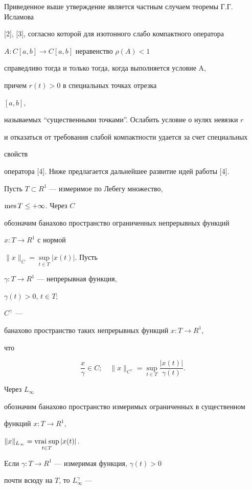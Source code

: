 Приведенное выше утверждение является частным случаем теоремы Г.Г.\,Исламова


[2], [3], согласно которой для изотонного слабо компактного оператора


$A:C[a,b]\to C[a,b]$ неравенство $\rho(A)<1$


справедливо тогда и только тогда, когда выполняется условие A,


причем $r(t) >0$ в специальных точках отрезка


$[a,b],$


называемых ``существенными точками''. Ослабить условие о нулях невязки $r$


и отказаться от требования слабой компактности удается за счет специальных


свойств


оператора [4]. Ниже предлагается дальнейшее развитие идей работы [4].





Пусть $T\subset R^1$ --- измеримое по Лебегу множество,


$\operatorname{mes} T\leq + \infty$. Через $C$


обозначим банахово пространство ограниченных непрерывных функций


$x:T\to R^1$ с нормой


$\|x\|_C=\sup\limits_{t\in T} |x(t)|.$ Пусть


$\gamma:T\to R^1$ --- непрерывная функция,


$\gamma(t)>0$, $t\in T$;


$C^\gamma$\ ---


банахово пространство таких непрерывных функций $x: T\to R^1$,


что


$$


\frac{x}{\gamma}\in C;\quad \|x\|_{C^{\gamma}} = \sup_{t\in


T}\frac{|x(t)|}{\gamma(t)}.


$$


Через $L_\infty$


обозначим банахово пространство измеримых ограниченных в существенном


функций $x:T\to R^1$,


$\|x\|_{L_{\infty}} = \vraisup\limits_{t\in T}|x(t)|$.


Если $\gamma:T\to R^1$ --- измеримая функция, $\gamma(t) >0$


почти всюду на $T$, то $L_\infty^\gamma$ ---



